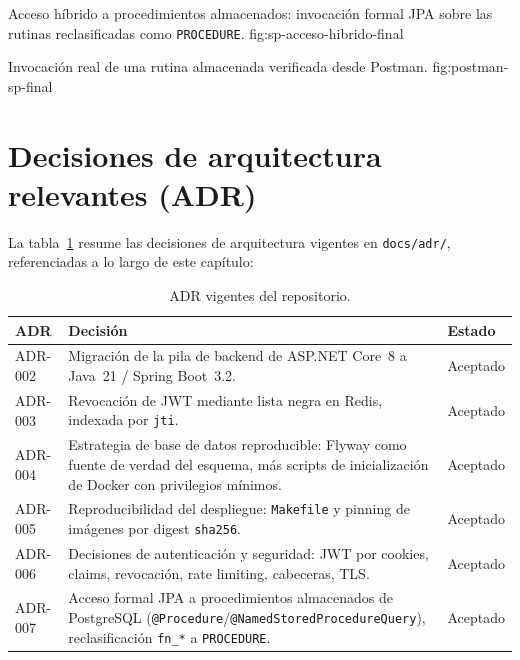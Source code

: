 %
{Acceso h\'ibrido a procedimientos almacenados: invocaci\'on formal JPA sobre las rutinas reclasificadas como \texttt{PROCEDURE}.}%
{fig:sp-acceso-hibrido-final}

%
{Invocaci\'on real de una rutina almacenada verificada desde Postman.}%
{fig:postman-sp-final}

\section{Decisiones de arquitectura relevantes (ADR)}
\label{sec:adr-relevantes-final}

La tabla~\ref{tab:adr-relevantes-final} resume las decisiones de
arquitectura vigentes en \texttt{docs/adr/}, referenciadas a lo largo de
este cap\'itulo:

\begin{table}[H]
  \centering
  \caption{ADR vigentes del repositorio.}
  \label{tab:adr-relevantes-final}
  \begin{tabular}{@{}p{2cm}p{9.5cm}p{2.5cm}@{}}
    \toprule
    ADR & Decisi\'on & Estado \\
    \midrule
    ADR-002 & Migraci\'on de la pila de backend de ASP.NET Core~8 a Java~21 / Spring Boot~3.2. & Aceptado \\
    ADR-003 & Revocaci\'on de JWT mediante lista negra en Redis, indexada por \texttt{jti}. & Aceptado \\
    ADR-004 & Estrategia de base de datos reproducible: Flyway como fuente de verdad del esquema, m\'as scripts de inicializaci\'on de Docker con privilegios m\'inimos. & Aceptado \\
    ADR-005 & Reproducibilidad del despliegue: \texttt{Makefile} y pinning de im\'agenes por digest \texttt{sha256}. & Aceptado \\
    ADR-006 & Decisiones de autenticaci\'on y seguridad: JWT por cookies, claims, revocaci\'on, rate limiting, cabeceras, TLS. & Aceptado \\
    ADR-007 & Acceso formal JPA a procedimientos almacenados de PostgreSQL (\texttt{@Procedure}/\texttt{@NamedStoredProcedureQuery}), reclasificaci\'on \texttt{fn\_*} a \texttt{PROCEDURE}. & Aceptado \\
    \bottomrule
  \end{tabular}
\end{table}

